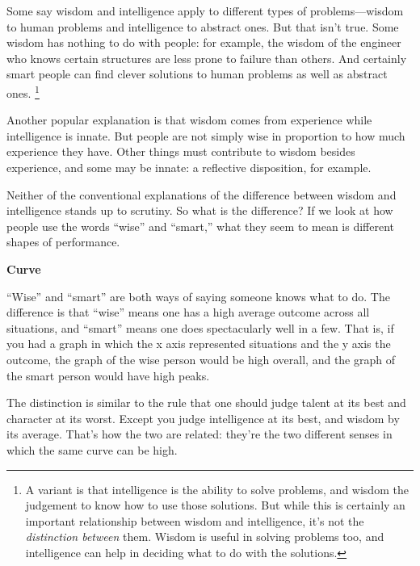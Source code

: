 \documentclass[12pt]{book}
\begin{document}
Some say wisdom and intelligence apply to different types of
problems---wisdom to human problems and intelligence to abstract ones.
But that isn't true. Some wisdom has nothing to do with people: for
example, the wisdom of the engineer who knows certain structures are
less prone to failure than others. And certainly smart people can find
clever solutions to human problems as well as abstract ones.
\footnote{A variant is that intelligence is the ability to solve problems,
and wisdom the judgement to know how to use those solutions. But while
this is certainly an important relationship between wisdom and
intelligence, it's not the \emph{distinction between} them. Wisdom is
useful in solving problems too, and intelligence can help in deciding
what to do with the solutions.}

Another popular explanation is that wisdom comes from experience while
intelligence is innate. But people are not simply wise in proportion to
how much experience they have. Other things must contribute to wisdom
besides experience, and some may be innate: a reflective disposition,
for example.

Neither of the conventional explanations of the difference between
wisdom and intelligence stands up to scrutiny. So what is the
difference? If we look at how people use the words ``wise'' and
``smart,'' what they seem to mean is different shapes of performance.

\textbf{Curve}

``Wise'' and ``smart'' are both ways of saying someone knows what to do.
The difference is that ``wise'' means one has a high average outcome
across all situations, and ``smart'' means one does spectacularly well
in a few. That is, if you had a graph in which the x axis represented
situations and the y axis the outcome, the graph of the wise person
would be high overall, and the graph of the smart person would have high
peaks.

The distinction is similar to the rule that one should judge talent at
its best and character at its worst. Except you judge intelligence at
its best, and wisdom by its average. That's how the two are related:
they're the two different senses in which the same curve can be high.
\end{document}
